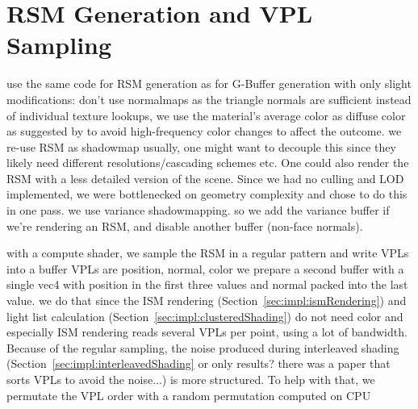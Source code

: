 \section{RSM Generation and VPL Sampling}
\label{sec:impl:rsmAndVplSampling}
\begin{outline}
\1 use the same code for RSM generation as for G-Buffer generation with only slight modifications:
\1 don't use normalmaps as the triangle normals are sufficient
\1 instead of individual texture lookups, we use the material's average color as diffuse color as suggested by \citet{hedman2016sequential} to avoid high-frequency color changes to affect the outcome.
\1 we re-use RSM as shadowmap
    \2 usually, one might want to decouple this since they likely need different resolutions/cascading schemes etc. One could also render the RSM with a less detailed version of the scene. Since we had no culling and LOD implemented, we were bottlenecked on geometry complexity and chose to do this in one pass.
    \2 we use variance shadowmapping. so we add the variance buffer if we're rendering an RSM, and disable another buffer (non-face normals).

\1 with a compute shader, we sample the RSM in a regular pattern and write VPLs into a buffer
\1 VPLs are position, normal, color
\1 we prepare a second buffer with a single vec4 with position in the first three values and normal packed into the last value.
\1 we do that since the ISM rendering (Section~\ref{sec:impl:ismRendering}) and light list calculation (Section~\ref{sec:impl:clusteredShading}) do not need color and especially ISM rendering reads several VPLs per point, using a lot of bandwidth.
\1 Because of the regular sampling, the noise produced during interleaved shading (Section~\ref{sec:impl:interleavedShading} or only results? there was a paper that sorts VPLs to avoid the noise...) is more structured. To help with that, we permutate the VPL order with a random permutation computed on CPU
\end{outline}

